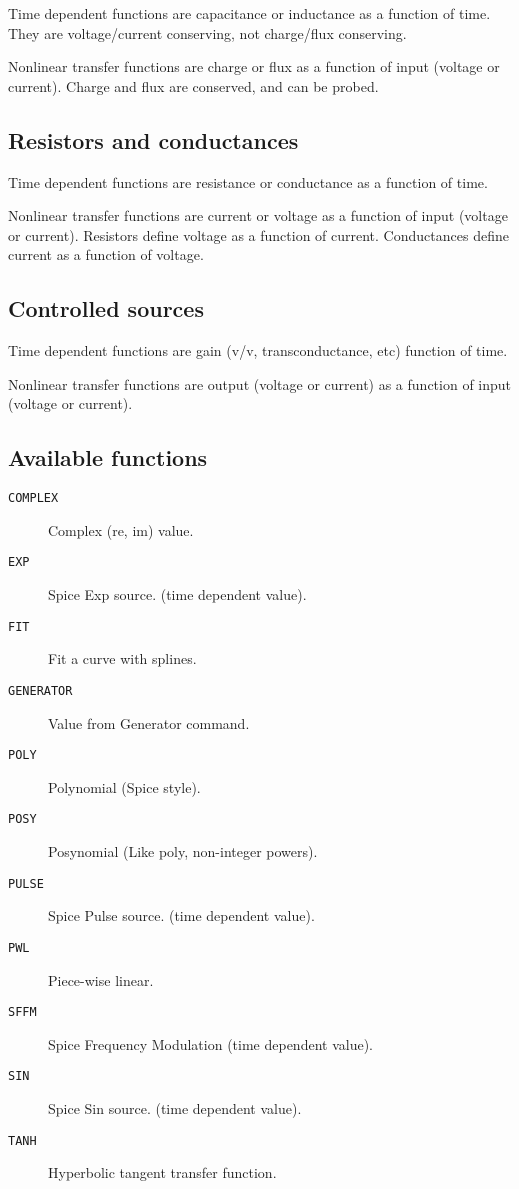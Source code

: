 Time dependent functions are capacitance or inductance as a function
of time.  They are voltage/current conserving, not charge/flux
conserving.

Nonlinear transfer functions are charge or flux as a function of input
(voltage or current).  Charge and flux are conserved, and can be
probed.
\subsection{Resistors and conductances}

Time dependent functions are resistance or conductance as a function
of time.

Nonlinear transfer functions are current or voltage as a function of
input (voltage or current).  Resistors define voltage as a function of
current.  Conductances define current as a function of voltage.
\subsection{Controlled sources}

Time dependent functions are gain (v/v, transconductance, etc)
function of time.

Nonlinear transfer functions are output (voltage or current) as a
function of input (voltage or current).
\subsection{Available functions}

\begin{description}

\item[{\tt COMPLEX}] Complex (re, im) value.
\item[{\tt EXP}] Spice Exp source.  (time dependent value).
\item[{\tt FIT}] Fit a curve with splines.
\item[{\tt GENERATOR}] Value from Generator command.
\item[{\tt POLY}] Polynomial (Spice style).
\item[{\tt POSY}] Posynomial (Like poly, non-integer powers).
\item[{\tt PULSE}] Spice Pulse source.  (time dependent value).
\item[{\tt PWL}] Piece-wise linear.
\item[{\tt SFFM}] Spice Frequency Modulation (time dependent value).
\item[{\tt SIN}] Spice Sin source.  (time dependent value).
\item[{\tt TANH}] Hyperbolic tangent transfer function.

\end{description}

